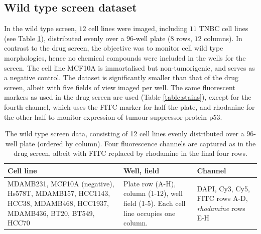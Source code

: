 
\subsection{Wild type screen dataset}
\label{subsec:morphogical}

In the wild type screen, $12$ cell lines were imaged, including $11$ TNBC cell lines (see Table \ref{table:morphscreen}), distributed evenly over a $96$-well plate ($8$ rows, $12$ columns). In contrast to the drug screen, the objective was to monitor cell wild type morphologies, hence no chemical compounds were included in the wells for the screen. The cell line MCF10A is immortalised but non-tumorigenic, and serves as a negative control. The dataset is significantly smaller than that of the drug screen, albeit with five fields of view imaged per well. The same fluorescent markers as used in the drug screen are used (Table \ref{table:stains}), except for the fourth channel, which uses the FITC marker for half the plate, and rhodanine for the other half to monitor expression of tumour-suppressor protein p53.

\begin{table}
\begin{center}
\begin{tabular}{|p{5cm}|p{3cm}|p{3cm}|}
\hline
Cell line & Well, field & Channel \\
\hline
MDAMB231, MCF10A (negative), Hs578T, MDAMB157, HCC1143, HCC38, MDAMB468, HCC1937, MDAMB436, BT20, BT549, HCC70 & Plate row (A-H), column (1-12), well field (1-5). Each cell line occupies one column. & DAPI, Cy3, Cy5, FITC rows A-D, \emph{rhodamine} rows E-H\\
\hline
\end{tabular}
\caption{The wild type screen data, consisting of 12 cell lines evenly distributed over a 96-well plate (ordered by column). Four fluorescence channels are captured as in the drug screen, albeit with FITC replaced by rhodamine in the final four rows.}
\label{table:morphscreen}
\end{center}
\end{table}

